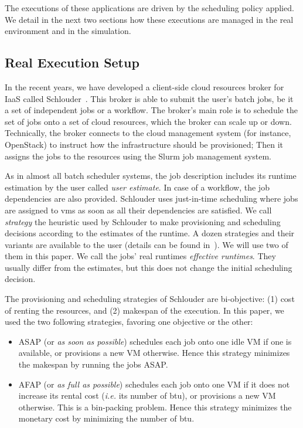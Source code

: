 \documentclass[10pt,conference,compsocconf]{IEEEtran}
\begin{document}
The executions of these applications are driven
by the scheduling policy applied. We detail in the next two sections how these
executions are managed in the real environment and in the simulation.  

\subsection{Real Execution Setup}

In the recent years, we have developed  a client-side cloud resources broker for IaaS
called  Schlouder~\cite{Michon17}.  This  broker is  able to  submit the  user's
batch jobs, be  it a set of  independent jobs or a workflow.   The broker's main
role is  to schedule the set  of jobs onto a  set of cloud resources,  which the
broker can scale up  or down.
Technically, the broker  connects to the cloud management  system (for instance,
OpenStack) to  instruct how  the infrastructure should  be provisioned; Then it
assigns the jobs to the resources using the Slurm job management system.

As  in almost  all batch  scheduler systems,  the job  description includes  its
runtime  estimation by  the  user called  \emph{user estimate}.   In  case of  a
workflow, the job  dependencies are also provided.   Schlouder uses just-in-time
scheduling where jobs are assigned to \acp{vm} as soon as all their dependencies
are satisfied.  We call \emph{strategy} the  heuristic used by Schlouder to make
provisioning and  scheduling decisions according to the estimates  of  the runtime.  
A  dozen strategies and  their variants
are available to  the user (details can be found  in~\cite{GenaudG11}). 
We will use two of them in this  paper.  We call  the jobs'  real
runtimes \emph{effective  runtimes}. They usually differ from  the estimates, but
this does not change the initial scheduling decision.

The provisioning and scheduling strategies of Schlouder are bi-objective: (1) %
cost of renting the resources, and (2) makespan of the execution.  In this paper, 
we used the two following strategies, favoring one objective or the other:
\begin{itemize}
\item ASAP (or \textit{as soon as possible}) schedules each job onto
  one idle VM if one is available, or provisions a new VM otherwise.
  Hence this strategy minimizes the makespan by running the jobs ASAP.

\item AFAP (or \textit{as full as  possible}) schedules each job onto
  one VM if it does not increase its rental cost (\textit{i.e.} its number
  of \ac{btu}), or provisions a new VM otherwise. This is a bin-packing problem.
  Hence this strategy minimizes the monetary cost by minimizing the number of \ac{btu}.
\end{itemize}
\end{document}
